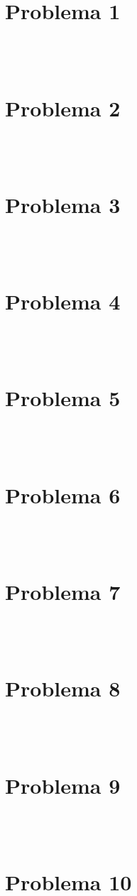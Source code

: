 	\section{Problema 1} \\
	 \\

	\section{Problema 2} \\
	 \\

	\section{Problema 3} \\
	 \\

	\section{Problema 4} \\
	 \\

	\section{Problema 5} \\
	 \\

	\section{Problema 6} \\
	 \\

	\section{Problema 7} \\
	 \\

	\section{Problema 8} \\
	 \\

	\section{Problema 9} \\
	 \\

	\section{Problema 10} \\
	 \\

